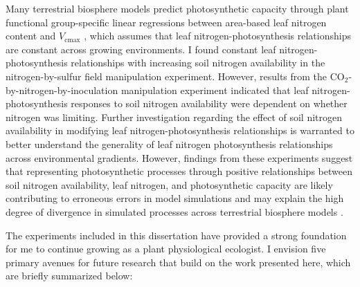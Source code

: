 Many terrestrial biosphere models predict photosynthetic capacity through plant functional group-specific linear regressions between area-based leaf nitrogen content and $V_\mathrm{cmax}$ , which assumes that leaf nitrogen-photosynthesis relationships are constant across growing environments. I found constant leaf nitrogen-photosynthesis relationships with increasing soil nitrogen availability in the nitrogen-by-sulfur field manipulation experiment. However, results from the CO$_2$-by-nitrogen-by-inoculation manipulation experiment indicated that leaf nitrogen-photosynthesis responses to soil nitrogen availability were dependent on whether nitrogen was limiting. Further investigation regarding the effect of soil nitrogen availability in modifying leaf nitrogen-photosynthesis relationships is warranted to better understand the generality of leaf nitrogen photosynthesis relationships across environmental gradients. However, findings from these experiments suggest that representing photosynthetic processes through positive relationships between soil nitrogen availability, leaf nitrogen, and photosynthetic capacity are likely contributing to erroneous errors in model simulations and may explain the high degree of divergence in simulated processes across terrestrial biosphere models .

The experiments included in this dissertation have provided a strong foundation for me to continue growing as a plant physiological ecologist. I envision five primary avenues for future research that build on the work presented here, which are briefly summarized below:

